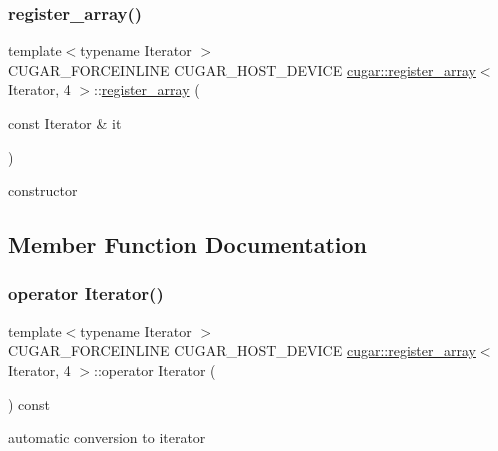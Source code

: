\subsubsection{\texorpdfstring{register\+\_\+array()}{register\_array()}\hspace{0.1cm}{\footnotesize\ttfamily [2/2]}}
{\footnotesize\ttfamily template$<$typename Iterator $>$ \\
C\+U\+G\+A\+R\+\_\+\+F\+O\+R\+C\+E\+I\+N\+L\+I\+NE C\+U\+G\+A\+R\+\_\+\+H\+O\+S\+T\+\_\+\+D\+E\+V\+I\+CE \hyperlink{structcugar_1_1register__array}{cugar\+::register\+\_\+array}$<$ Iterator, 4 $>$\+::\hyperlink{structcugar_1_1register__array}{register\+\_\+array} (\begin{DoxyParamCaption}\item[{const Iterator \&}]{it }\end{DoxyParamCaption})\hspace{0.3cm}{\ttfamily [inline]}}

constructor 

\subsection{Member Function Documentation}
\mbox{\label{structcugar_1_1register__array_3_01_iterator_00_014_01_4_a1d5d60b8e15721cb25a866b36803fa4a}} 
\subsubsection{\texorpdfstring{operator Iterator()}{operator Iterator()}}
{\footnotesize\ttfamily template$<$typename Iterator $>$ \\
C\+U\+G\+A\+R\+\_\+\+F\+O\+R\+C\+E\+I\+N\+L\+I\+NE C\+U\+G\+A\+R\+\_\+\+H\+O\+S\+T\+\_\+\+D\+E\+V\+I\+CE \hyperlink{structcugar_1_1register__array}{cugar\+::register\+\_\+array}$<$ Iterator, 4 $>$\+::operator Iterator (\begin{DoxyParamCaption}{ }\end{DoxyParamCaption}) const\hspace{0.3cm}{\ttfamily [inline]}}

automatic conversion to iterator \mbox{\label{structcugar_1_1register__array_3_01_iterator_00_014_01_4_a6052ee3e8b0d78dbf3fbd531a7ee8297}} 
